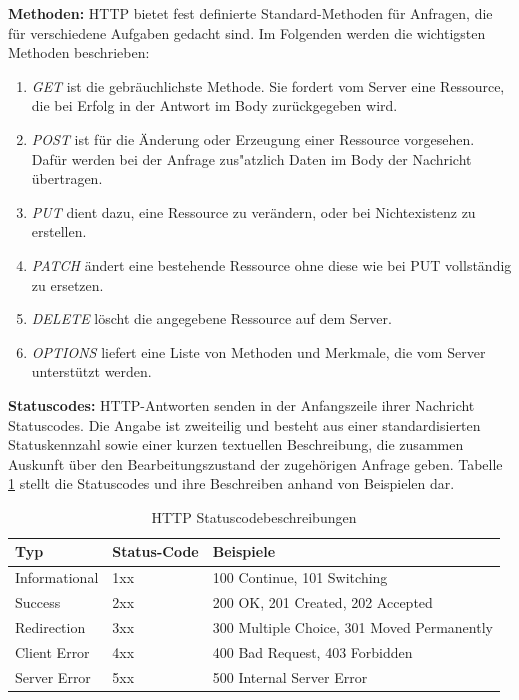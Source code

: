 \noindent
{}
\textbf{Methoden:}
HTTP bietet fest definierte Standard-Methoden für Anfragen, die für verschiedene Aufgaben gedacht sind. Im Folgenden werden die wichtigsten Methoden beschrieben:
\begin{enumerate}
		\item \textit{GET} ist die gebräuchlichste Methode. Sie fordert vom Server eine Ressource, die bei Erfolg in der Antwort im Body zurückgegeben wird. 
		
		\item \textit{POST} ist für die Änderung oder Erzeugung einer Ressource vorgesehen. Dafür werden bei der Anfrage zus"atzlich Daten im Body der Nachricht übertragen.
		
		\item \textit{PUT} dient dazu, eine Ressource zu verändern, oder bei Nichtexistenz zu erstellen.
	
		\item \textit{PATCH} ändert eine bestehende Ressource ohne diese wie bei PUT vollständig zu ersetzen. 
		
		\item \textit{DELETE} löscht die angegebene Ressource auf dem Server.
		
		\item \textit{OPTIONS} liefert eine Liste von Methoden und Merkmale, die vom Server unterstützt werden.
		
\end{enumerate}
\newpage
\noindent
{}
\textbf{Statuscodes:}
HTTP-Antworten senden in der Anfangszeile ihrer Nachricht Statuscodes. Die Angabe ist zweiteilig und besteht aus einer standardisierten Statuskennzahl sowie einer kurzen textuellen Beschreibung, die zusammen Auskunft über den Bearbeitungszustand der zugehörigen Anfrage geben. Tabelle \ref{tab:HTTPStatuscode} stellt die Statuscodes und ihre Beschreiben anhand von Beispielen dar. \newline

\begin{table}[tbt]
\caption{HTTP Statuscodebeschreibungen}
\label{tab:HTTPStatuscode}
\begin{center}
    \begin{tabular}{ l  l   p{8cm} }
    \toprule
    Typ & Status-Code & Beispiele \\
    \midrule
    
    Informational & 1xx & 100 Continue, 101 Switching\\

    Success & 2xx & 200 OK, 201 Created, 202 Accepted  \\

	Redirection & 3xx & 300 Multiple Choice, 301 Moved Permanently  \\

    Client Error & 4xx & 400 Bad Request, 403 Forbidden\\ 

    Server Error & 5xx & 500 Internal Server Error \\
    \bottomrule
    \end{tabular}
\end{center}
\end{table}

